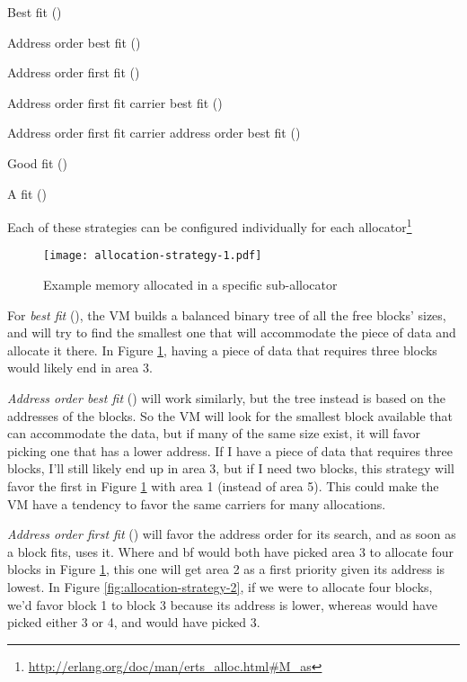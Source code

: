\documentclass[11pt, oneside]{book}   	%
\begin{document}
\begin{enumerate*}
    \item Best fit ()
    \item Address order best fit ()
    \item Address order first fit ()
    \item Address order first fit carrier best fit ()
    \item Address order first fit carrier address order best fit ()
    \item Good fit ()
    \item A fit ()
\end{enumerate*}

Each of these strategies can be configured individually for each  allocator\footnote{\href{http://erlang.org/doc/man/erts\_alloc.html\#M\_as}{http://erlang.org/doc/man/erts\_alloc.html\#M\_as}}

\begin{figure}
  \texttt{[image: allocation-strategy-1.pdf]}%
  \centering%
  \caption{Example memory allocated in a specific sub-allocator}%
   \label{fig:allocation-strategy-1}
\end{figure}
\FloatBarrier

For \emph{best fit} (), the VM builds a balanced binary tree of all the free blocks' sizes, and will try to find the smallest one that will accommodate the piece of data and allocate it there. In Figure \ref{fig:allocation-strategy-1}, having a piece of data that requires three blocks would likely end in area 3.

\emph{Address order best fit} () will work similarly, but the tree instead is based on the addresses of the blocks. So the VM will look for the smallest block available that can accommodate the data, but if many of the same size exist, it will favor picking one that has a lower address. If I have a piece of data that requires three blocks, I'll still likely end up in area 3, but if I need two blocks, this strategy will favor the first  in Figure \ref{fig:allocation-strategy-1} with area 1 (instead of area 5). This could make the VM have a tendency to favor the same carriers for many allocations.

\emph{Address order first fit} () will favor the address order for its search, and as soon as a block fits,  uses it. Where  and bf would both have picked area 3 to allocate four blocks in Figure \ref{fig:allocation-strategy-1}, this one will get area 2 as a first priority given its address is lowest. In Figure \ref{fig:allocation-strategy-2}, if we were to allocate four blocks, we'd favor block 1 to block 3 because its address is lower, whereas  would have picked either 3 or 4, and  would have picked 3.
\end{document}
